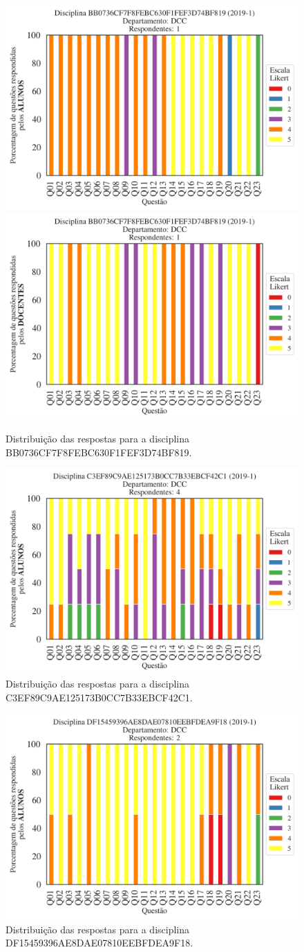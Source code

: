 \documentclass[a4paper,10pt]{article}
\begin{document}
\begin{figure}[h]
\centering
\includegraphics[width=0.485\linewidth]{analise_disciplina_departamento_DCC_ALUNO_TURMA_BB0736CF7F8FEBC630F1FEF3D74BF819.png}
\includegraphics[width=0.485\linewidth]{analise_disciplina_departamento_DCC_DOCENTE_TURMA_BB0736CF7F8FEBC630F1FEF3D74BF819.png}
\caption{\label{fig:analise_geral_departamento}                Distribuição das respostas para a disciplina BB0736CF7F8FEBC630F1FEF3D74BF819.}
\end{figure}
\begin{figure}[h]
\centering
\includegraphics[width=0.485\linewidth]{analise_disciplina_departamento_DCC_ALUNO_TURMA_C3EF89C9AE125173B0CC7B33EBCF42C1.png}
\caption{\label{fig:analise_geral_departamento}                Distribuição das respostas para a disciplina C3EF89C9AE125173B0CC7B33EBCF42C1.}
\end{figure}
\begin{figure}[h]
\centering
\includegraphics[width=0.485\linewidth]{analise_disciplina_departamento_DCC_ALUNO_TURMA_DF15459396AE8DAE07810EEBFDEA9F18.png}
\caption{\label{fig:analise_geral_departamento}                Distribuição das respostas para a disciplina DF15459396AE8DAE07810EEBFDEA9F18.}
\end{figure}
\end{document}
